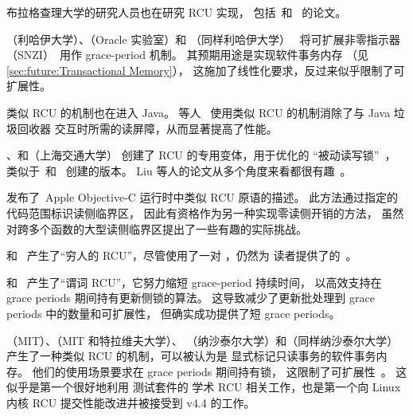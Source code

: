 布拉格查理大学的研究人员也在研究 RCU 实现，
包括~\cite{AndrejPodzimek2010masters}和
~\cite{AdamHraska2013RCUHelenOS}的论文。

（利哈伊大学）、（Oracle 实验室）和
（同样利哈伊大学）~\cite{Liu:2013:MSA:2549695.2549732}
将可扩展非零指示器
（SNZI）~\cite{FaithEllen:2007:SNZI}用作 grace-period 机制。
其预期用途是实现软件事务内存
（见\cref{sec:future:Transactional Memory}），
这施加了线性化要求，反过来似乎限制了可扩展性。

类似 RCU 的机制也在进入 Java。
等人~\cite{Sivaramakrishnan:2012:ERB:2258996.2259005}
使用类似 RCU 的机制消除了与 Java 垃圾回收器
交互时所需的读屏障，从而显著提高了性能。

、和（上海交通大学）
创建了 RCU 的专用变体，用于优化的
``被动读写锁''~\cite{RanLiu2014PassiveRWLock}，
类似于~\cite{GauthamShenoy2006RCUrwlock}和
~\cite{SrivatsaSBhat2014RCUrwlock}创建的版本。
Liu 等人的论文从多个角度来看都很有趣~\cite{PaulEMcKenney2014ReadMostly}。

发布了~\cite{MikeAsh2015Apple}Apple Objective-C
运行时中类似 RCU 原语的描述。
此方法通过指定的代码范围标识读侧临界区，
因此有资格作为另一种实现零读侧开销的方法，
虽然对跨多个函数的大型读侧临界区提出了一些有趣的实际挑战。

和~\cite{PedroRmalhete2015PoorMansRCU}
产生了``穷人的 RCU''，尽管使用了一对
，仍然为
读者提供了的~\cite{PaulEMcKenney2015ReadMostly}。

和~\cite{Arbel:2015:PRR:2858788.2688518}
产生了``谓词 RCU''，它努力缩短 grace-period 持续时间，
以高效支持在 grace periods 期间持有更新侧锁的算法。
这导致减少了更新批处理到 grace periods 中的数量和可扩展性，
但确实成功提供了短 grace periods。

\QuickQuizEnd

（MIT）、（MIT 和特拉维夫大学）、
（纳沙泰尔大学）和（同样纳沙泰尔大学）~\cite{Matveev:2015:RLS:2815400.2815406}
产生了一种类似 RCU 的机制，可以被认为是
显式标记只读事务的软件事务内存。
他们的使用场景要求在 grace periods 期间持有锁，
这限制了可扩展性~\cite{PaulEMcKenney2015ReadMostly,PaulEMcKenney2015ReadMostlySidebar}。
这似乎是第一个很好地利用  测试套件的
学术 RCU 相关工作，也是第一个向 Linux 内核 RCU
提交性能改进并被接受到 v4.4 的工作。

